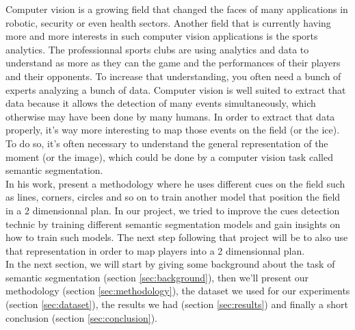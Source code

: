 Computer vision is a growing field that changed the faces of many applications in robotic, security or even health sectors. Another field that is currently having more and more interests in such computer vision applications is the sports analytics. The professionnal sports clubs are using analytics and data to understand as more as they can the game and the performances of their players and their opponents. To increase that understanding, you often need a bunch of experts analyzing a bunch of data. Computer vision is well suited to extract that data because it allows the detection of many events simultaneously, which otherwise may have been done by many humans. In order to extract that data properly, it's way more interesting to map those events on the field (or the ice). To do so, it's often necessary to understand the general representation of the moment (or the image), which could be done by a computer vision task called semantic segmentation.
\\
In his work, \cite{Homayounfar} present a methodology where he uses different cues on the field such as lines, corners, circles and so on to train another model that position the field in a 2 dimensionnal plan. In our project, we tried to improve the cues detection technic by training different semantic segmentation models and gain insights on how to train such models. The next step following that project will be to also use that representation in order to map players into a 2 dimensionnal plan.
\\
In the next section, we will start by giving some background about the task of semantic segmentation (section \ref{sec:background}), then we'll present our methodology (section \ref{sec:methodology}), the dataset we used for our experiments (section \ref{sec:dataset}), the results we had (section \ref{sec:results}) and finally a short conclusion (section \ref{sec:conclusion}).

 